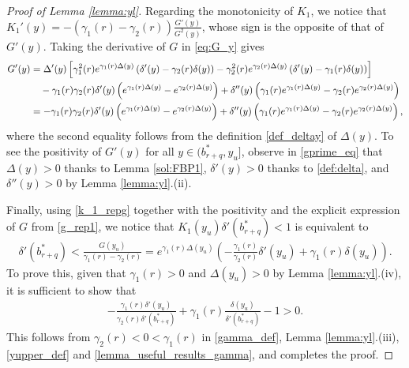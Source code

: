 \documentclass[10pt,a4paper]{amsart}
\begin{document}
\begin{proof}[Proof of Lemma \ref{lemma:yl}]
Regarding the monotonicity of $K_1$, we notice that $K_1'(y) = - (\gamma_1(r)-\gamma_2(r)) \frac{G'(y)}{G^2(y)}$, whose sign is the opposite of that of $G'(y)$. Taking the derivative of $G$ in \eqref{eq:G_y} gives
\begin{align} \label{gprime_eq}
G'(y)
&= \Delta'(y) \left[ \gamma_1^2(r)e^{\gamma_1(r)\Delta(y)}\left( \delta'(y) - \gamma_2(r) \delta(y) \right)
- \gamma_2^2(r)e^{\gamma_2(r)\Delta(y)}\left( \delta'(y) - \gamma_1(r)\delta(y) \right)
\right] \notag\\
&\quad -\gamma_1(r)\gamma_2(r) \delta'(y)\left(e^{\gamma_1(r)\Delta(y) } - e^{\gamma_2(r)\Delta(y)} \right)
+ \delta''(y)\left(\gamma_1(r)e^{\gamma_1(r)\Delta(y) } - \gamma_2(r)e^{\gamma_2(r)\Delta(y)} \right) \notag\\
&= -\gamma_1(r)\gamma_2(r) \delta'(y)\left(e^{\gamma_1(r)\Delta(y) } - e^{\gamma_2(r)\Delta(y)} \right)
+ \delta''(y)\left(\gamma_1(r)e^{\gamma_1(r)\Delta(y) } - \gamma_2(r)e^{\gamma_2(r)\Delta(y)} \right),
\end{align}
where the second equality follows from the definition \eqref{def_deltay} of $\Delta(y)$. 
To see the positivity of $G'(y)$ for all $y \in (b^*_{r+q}, y_u]$, observe in \eqref{gprime_eq} that $\Delta(y) > 0$ thanks to Lemma \ref{sol:FBP1}, $\delta'(y) > 0$ thanks to \eqref{def:delta}, and $\delta''(y) > 0$ by Lemma \ref{lemma:yl}.(ii). 

Finally, using \eqref{k_1_repg} together with the positivity and the explicit expression of $G$ from \eqref{g_rep1}, we notice that $K_1(y_u)\delta'(b^*_{r+q})<1$ is equivalent to 
\begin{align*}
\delta'(b^*_{r+q}) < \frac{G(y_u)}{\gamma_1(r)-\gamma_2(r)} = e^{\gamma_1(r)\Delta(y_u)} \left(-\frac{\gamma_1(r)}{\gamma_2(r)}\delta'(y_u)+\gamma_1(r)\delta(y_u)\right). 
\end{align*}
To prove this, given that $\gamma_1(r)>0$ and $\Delta(y_u) > 0$ by Lemma \ref{lemma:yl}.(iv), it is sufficient to show that
\begin{align*}
- \frac{\gamma_1(r) \delta'(y_u)}{\gamma_2(r) \delta'(b^*_{r+q})} + \gamma_1(r) \frac{\delta(y_u)}{\delta'(b^*_{r+q})} - 1 > 0.
\end{align*}
This follows from $\gamma_2(r)<0< \gamma_1(r)$ in \eqref{gamma_def}, Lemma \ref{lemma:yl}.(iii), \eqref{yupper_def} and \eqref{lemma_useful_results_gamma}, 
and completes the proof.
\end{proof}
\end{document}
